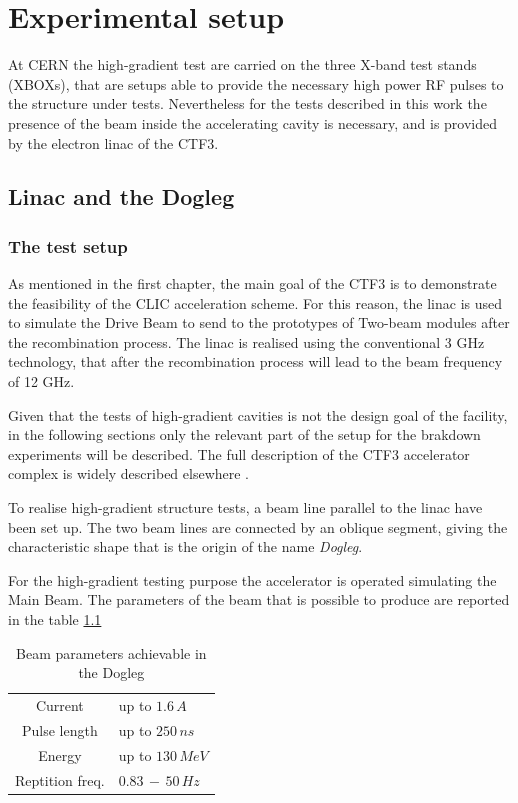 \chapter[Experimental setup]{Experimental setup}

At CERN the high-gradient test are carried on the three X-band test stands (XBOXs), that are setups able to provide the necessary high power RF pulses to the structure under tests. Nevertheless for the tests described in this work the presence of the beam inside the accelerating cavity is necessary, and is provided by the electron linac of the CTF3. 


\section[Linac and dogleg]{Linac and the Dogleg}

\subsection[The test setup]{The test setup}
As mentioned in the first chapter, the main goal of the CTF3 is to demonstrate the feasibility of the CLIC acceleration scheme. For this reason, the linac is used to simulate the Drive Beam to send to the prototypes of Two-beam modules after the recombination process. The linac is realised using the conventional 3 GHz technology, that after the recombination process will lead to the beam frequency of 12 GHz. 

Given that the tests of high-gradient cavities is not the design goal of the facility, in the following sections only the relevant part of the setup for the brakdown experiments will be described. The full description of the CTF3 accelerator complex is widely described elsewhere \cite{CLIC:cdr,CTF:drive_beam,ctf3:dr}.

To realise high-gradient structure tests, a beam line parallel to the linac have been set up. The two beam lines are connected by an oblique segment, giving the characteristic shape that is the origin of the name \textit{Dogleg}.

For the high-gradient testing purpose the accelerator is operated simulating the Main Beam. The parameters of the beam that is possible to produce are reported in the table \ref{beam_par_dogleg}


\begin{table}
  \centering
    \begin{tabular}{ c l }
    \hline
    Current 		&	up to $1.6\,A$\\
    Pulse length		&	up to $250\,ns$\\
    Energy			&	up to $130\, MeV$\\
    Reptition freq.	&	$0.83\,-\,50\, Hz$\\

    \hline
    \end{tabular}
\caption{Beam parameters achievable in the Dogleg \cite{NavarroQuirante:2025954}}
\label{beam_par_dogleg}
\end{table}



